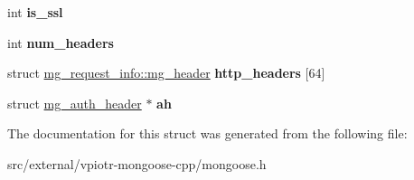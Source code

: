 \begin{DoxyCompactItemize}
\item 
\hypertarget{structmg__request__info_af66a6c4c2364a37b87f646f76b9e7d3d}{int {\bfseries is\-\_\-ssl}}\label{structmg__request__info_af66a6c4c2364a37b87f646f76b9e7d3d}

\item 
\hypertarget{structmg__request__info_afcdf69ee822fd9786f3e30c6d10b192a}{int {\bfseries num\-\_\-headers}}\label{structmg__request__info_afcdf69ee822fd9786f3e30c6d10b192a}

\item 
\hypertarget{structmg__request__info_ac62dca1d3ac0c60a06a0b15262f16371}{struct \hyperlink{structmg__request__info_1_1mg__header}{mg\-\_\-request\-\_\-info\-::mg\-\_\-header} {\bfseries http\-\_\-headers} \mbox{[}64\mbox{]}}\label{structmg__request__info_ac62dca1d3ac0c60a06a0b15262f16371}

\item 
\hypertarget{structmg__request__info_a79b24667d7c29bf06fc3adbdee6981e0}{struct \hyperlink{structmg__auth__header}{mg\-\_\-auth\-\_\-header} $\ast$ {\bfseries ah}}\label{structmg__request__info_a79b24667d7c29bf06fc3adbdee6981e0}

\end{DoxyCompactItemize}


The documentation for this struct was generated from the following file\-:\begin{DoxyCompactItemize}
\item 
src/external/vpiotr-\/mongoose-\/cpp/mongoose.\-h\end{DoxyCompactItemize}
